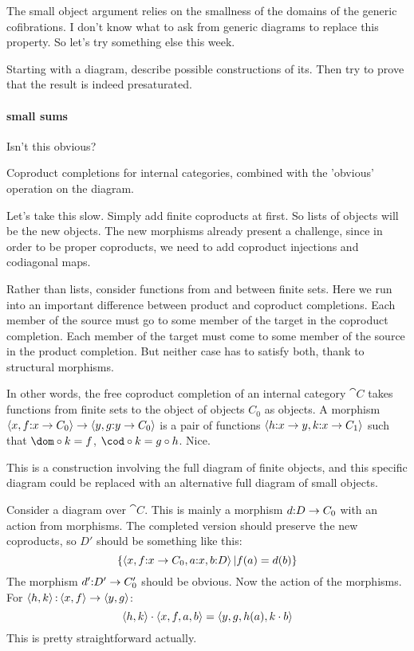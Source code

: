 \documentclass[csh.tex]{subfiles}
\begin{document}
The small object argument relies on the smallness of the domains of the generic cofibrations. I don't know what to ask from generic diagrams to replace this property. So let's try something else this week.

Starting with a diagram, describe possible constructions of its. Then try to prove that the result is indeed presaturated.

\paragraph{small sums}
Isn't this obvious?

Coproduct completions for internal categories, combined with the 'obvious' operation on the diagram.

Let's take this slow. Simply add finite coproducts at first. So lists of objects will be the new objects. The new morphisms already present a challenge, since in order to be proper coproducts, we need to add coproduct injections and codiagonal maps.

Rather than lists, consider functions from and between finite sets. Here we run into an important difference between product and coproduct completions. Each member of the source must go to some member of the target in the coproduct completion. Each member of the target must come to some member of the source in the product completion. But neither case has to satisfy both, thank to structural morphisms.

In other words, the free coproduct completion of an internal category $\cat C$ takes functions from finite sets to the object of objects $C_0$ as objects. A morphism $\left\langle x,f\mathord : x\to C_0 \right\rangle\to\left\langle y,g\mathord : y\to C_0 \right\rangle$ is a pair of functions $\left\langle h\mathord : x\to y,k\mathord : x\to C_1 \right\rangle$ such that $\dom\circ k = f$, $\cod\circ k = g\circ h$. Nice.

This is a construction involving the full diagram of finite objects, and this specific diagram could be replaced with an alternative full diagram of small objects.

Consider a diagram over $\cat C$. This is mainly a morphism $d\mathord : D\to C_0$ with an action from morphisms. 
The completed version should preserve the new coproducts, so $D'$ should be something like this:
\[ \left\{\left\langle x,f\mathord : x\to C_0, a\mathord : x, b\mathord : D \right\rangle| f(a) = d(b) \right\}\]
The morphism $d'\mathord : D'\to C_0'$ should be obvious. Now the action of the morphisms. For $\left\langle h,k \right\rangle\mathord :\left\langle x,f \right\rangle\to\left\langle y,g \right\rangle$:
\[ \left\langle h,k \right\rangle\cdot\left\langle x,f,a,b \right\rangle = \left\langle y,g,h(a),k\cdot b \right\rangle\]
This is pretty straightforward actually.
\end{document}
